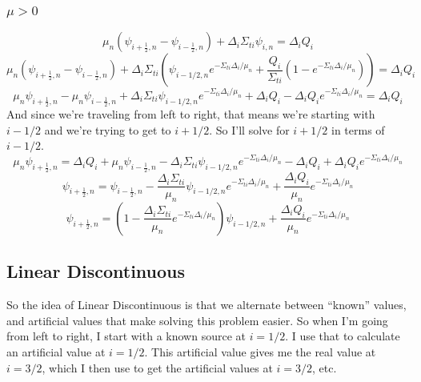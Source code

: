 \documentclass[a4paper]{article}
\begin{document}
 \subsubsection*{$\mu>0$}
\[\mu_n\left(\psi_{i+\frac{1}{2},n}-\psi_{i-\frac{1}{2},n}\right)+\Delta_i\Sigma_{ti}\psi_{i,n}=\Delta_iQ_i\]
\[\mu_n\left(\psi_{i+\frac{1}{2},n}-\psi_{i-\frac{1}{2},n}\right)+\Delta_i\Sigma_{ti}\left(\psi_{i-1/2,n}e^{-\Sigma_{ti}\Delta_i/\mu_n}+\frac{Q_i}{\Sigma_{ti}}\left(1-e^{-\Sigma_{ti}\Delta_i/\mu_n}\right)\right)=\Delta_iQ_i\]
\[\mu_n\psi_{i+\frac{1}{2},n}-\mu_n\psi_{i-\frac{1}{2},n}+\Delta_i\Sigma_{ti}\psi_{i-1/2,n}e^{-\Sigma_{ti}\Delta_i/\mu_n}+\Delta_iQ_i-\Delta_iQ_ie^{-\Sigma_{ti}\Delta_i/\mu_n}=\Delta_iQ_i\]
And since we're traveling from left to right, that means we're starting with $i-1/2$ and we're trying to get to $i+1/2$. So I'll solve for $i+1/2$ in terms of $i-1/2$.
\[\mu_n\psi_{i+\frac{1}{2},n}=\Delta_iQ_i+\mu_n\psi_{i-\frac{1}{2},n}-\Delta_i\Sigma_{ti}\psi_{i-1/2,n}e^{-\Sigma_{ti}\Delta_i/\mu_n}-\Delta_iQ_i+\Delta_iQ_ie^{-\Sigma_{ti}\Delta_i/\mu_n}\]
\[\psi_{i+\frac{1}{2},n}=\psi_{i-\frac{1}{2},n}-\frac{\Delta_i\Sigma_{ti}}{\mu_n}\psi_{i-1/2,n}e^{-\Sigma_{ti}\Delta_i/\mu_n}+\frac{\Delta_iQ_i}{\mu_n}e^{-\Sigma_{ti}\Delta_i/\mu_n}\]
\[\boxed{\psi_{i+\frac{1}{2},n}=\left(1-\frac{\Delta_i\Sigma_{ti}}{\mu_n}e^{-\Sigma_{ti}\Delta_i/\mu_n}\right)\psi_{i-1/2,n}+\frac{\Delta_iQ_i}{\mu_n}e^{-\Sigma_{ti}\Delta_i/\mu_n}}\]




 \subsection*{Linear Discontinuous}
 So the idea of Linear Discontinuous is that we alternate between ``known'' values, and artificial values that make solving this problem easier. So when I'm going from left to right, I start with a known source at $i=1/2$. I use that to calculate an artificial value at $i=1/2$. This artificial value gives me the real value at $i=3/2$, which I then use to get the artificial values at $i=3/2$, etc.
 
\end{document}
